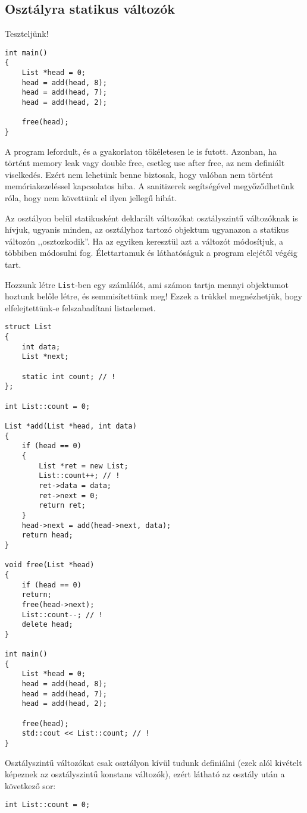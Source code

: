 \documentclass[../cpp_book/cpp_book.tex]{subfiles}
\begin{document}
	\subsection{Osztályra statikus változók}
	Teszteljünk!
	\begin{lstlisting}
int main()
{
	List *head = 0;
	head = add(head, 8);
	head = add(head, 7);
	head = add(head, 2);
	
	free(head);
}
	\end{lstlisting}
	A program lefordult, és a gyakorlaton tökéletesen le is futott. Azonban, ha történt memory leak vagy double free, esetleg use after free, az nem definiált viselkedés. Ezért nem lehetünk benne biztosak, hogy valóban nem történt memóriakezeléssel kapcsolatos hiba. A sanitizerek segítségével megyőződhetünk róla, hogy nem követtünk el ilyen jellegű hibát.
	
	\smallskip
	Az osztályon belül statikusként deklarált változókat osztályszintű változóknak is hívjuk, ugyanis minden, az osztályhoz tartozó objektum ugyanazon a statikus változón ,,osztozkodik''. Ha az egyiken keresztül azt a változót módosítjuk, a többiben módosulni fog. Élettartamuk és láthatóságuk a program elejétől végéig tart.
	
	Hozzunk létre \texttt{List}-ben egy számlálót, ami számon tartja mennyi objektumot hoztunk belőle létre, és semmisítettünk meg! Ezzek a trükkel megnézhetjük, hogy elfelejtettünk-e felszabadítani listaelemet.
	\begin{lstlisting}
struct List
{
	int data;
	List *next;
	
	static int count; // !
};

int List::count = 0;

List *add(List *head, int data)
{
	if (head == 0)
	{
		List *ret = new List;
	    List::count++; // !
		ret->data = data;
		ret->next = 0;
		return ret;
	}
	head->next = add(head->next, data);
	return head;
}

void free(List *head)
{
	if (head == 0)
	return;
	free(head->next);
	List::count--; // !
	delete head;
}

int main()
{
	List *head = 0;
	head = add(head, 8);
	head = add(head, 7);
	head = add(head, 2);
	
	free(head);
	std::cout << List::count; // !
}
	\end{lstlisting}
	
	Osztályszintű változókat csak osztályon kívül tudunk definiálni (ezek alól kivételt képeznek az osztályszintű konstans változók), ezért látható az osztály után a következő sor:
	\begin{lstlisting}
int List::count = 0;
	\end{lstlisting}
	
\end{document}
